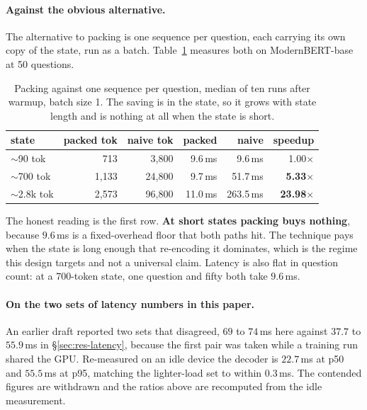 \paragraph{Against the obvious alternative.} The alternative to packing is
one sequence per question, each carrying its own copy of the state, run as
a batch. Table~\ref{tab:packing} measures both on ModernBERT-base at 50
questions.

\begin{table}[h]
\centering
\begin{tabular}{lrrrrr}
\toprule
state & packed tok & naive tok & packed & naive & speedup \\
\midrule
$\sim$90 tok   &   713 &  3{,}800 &  9.6\,ms &   9.6\,ms & 1.00$\times$ \\
$\sim$700 tok  & 1{,}133 & 24{,}800 &  9.7\,ms &  51.7\,ms & \textbf{5.33$\times$} \\
$\sim$2.8k tok & 2{,}573 & 96{,}800 & 11.0\,ms & 263.5\,ms & \textbf{23.98$\times$} \\
\bottomrule
\end{tabular}
\caption{Packing against one sequence per question, median of ten runs
after warmup, batch size 1. The saving is in the state, so it grows with
state length and is nothing at all when the state is short.}
\label{tab:packing}
\end{table}

The honest reading is the first row. \textbf{At short states packing buys
nothing}, because $9.6$\,ms is a fixed-overhead floor that both paths hit.
The technique pays when the state is long enough that re-encoding it
dominates, which is the regime this design targets and not a universal
claim. Latency is also flat in question count: at a 700-token state, one
question and fifty both take $9.6$\,ms.

\paragraph{On the two sets of latency numbers in this paper.} An earlier
draft reported two sets that disagreed, $69$ to $74$\,ms here against
$37.7$ to $55.9$\,ms in \S\ref{sec:res-latency}, because the first pair
was taken while a training run shared the GPU. Re-measured on an idle
device the decoder is $22.7$\,ms at p50 and $55.5$\,ms at p95, matching
the lighter-load set to within $0.3$\,ms. The contended figures are
withdrawn and the ratios above are recomputed from the idle
measurement.

